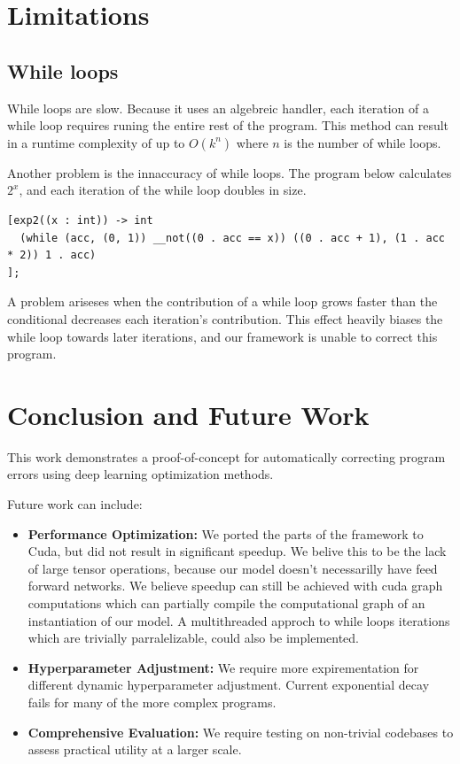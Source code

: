 \documentclass{article}
\begin{document}
\section{Limitations}
\subsection*{While loops}
While loops are slow. Because it uses an algebreic handler, each iteration of a while loop requires runing the entire rest of the program. This method can result in a runtime complexity of up to $O(k^n)$ where $n$ is the number of while loops.

Another problem is the innaccuracy of while loops. The program below calculates $2^x$, and each iteration of the while loop doubles in size.
\begin{verbatim}
[exp2((x : int)) -> int
  (while (acc, (0, 1)) __not((0 . acc == x)) ((0 . acc + 1), (1 . acc * 2)) 1 . acc)
];
\end{verbatim}
A problem ariseses when the contribution of a while loop grows faster than the conditional decreases each iteration's contribution. This effect heavily biases the while loop towards later iterations, and our framework is unable to correct this program.

\section{Conclusion and Future Work}
This work demonstrates a proof-of-concept for automatically correcting program errors using deep learning optimization methods.

Future work can include:
\begin{itemize}
\item \textbf{Performance Optimization:} We ported the parts of the framework to Cuda, but did not result in significant speedup. We belive this to be the lack of large tensor operations, because our model doesn't necessarilly have feed forward networks. We believe speedup can still be achieved with cuda graph computations which can partially compile the computational graph of an instantiation of our model. A multithreaded approch to while loops iterations which are trivially parralelizable, could also be implemented.
\item \textbf{Hyperparameter Adjustment:} We require more expirementation for different dynamic hyperparameter adjustment. Current exponential decay fails for many of the more complex programs.
\item \textbf{Comprehensive Evaluation:} We require testing on non-trivial codebases to assess practical utility at a larger scale.
\end{itemize}



\end{document}
